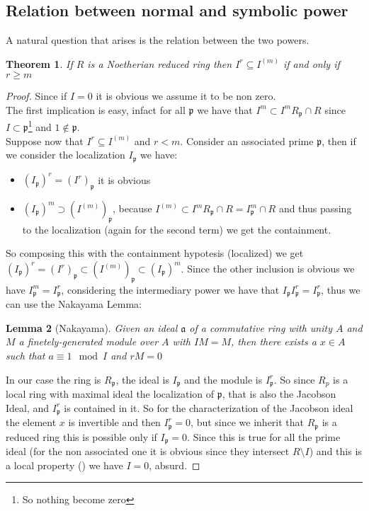 \documentclass[]{article}
\theoremstyle{plain}
\newtheorem{teo}{Theorem}[section]
\newtheorem{lem}[teo]{Lemma}
\theoremstyle{remark}
\theoremstyle{definition}
\newcommand{\p}{\mathfrak{p}}
\newcommand{\A}{\mathfrak{a}}
\begin{document}



\subsection{Relation between normal and symbolic power}
A natural question that arises is the relation between the two powers.


\begin{teo}
	If $ R $ is a Noetherian reduced ring then $ I^r \subseteq I^{(m)}$  if and only if $ r \geq m $
\end{teo}
\begin{proof}
	Since if $ I=0 $ it is obvious we assume it to be non zero.\\
	The first implication is easy, infact for all $ \p $ we have that $ I^m \subset I^mR_\p \cap R $ since $ I \subset \p $\footnote{So nothing become zero} and $ 1 \not \in \p $.\\
	Suppose now that $ I^r \subseteq I^{(m)}$ and $ r < m $. Consider an associated prime $ \p $, then if we consider the localization $ I_\p $ we have:
	\begin{itemize}
	\item $ (I_\p)^r = (I^r)_\p $ it is obvious
	\item $ (I_\p)^m \supset (I^{(m)})_\p $, because $ I^{(m)} \subset I^mR_\p \cap R = I^m_\p \cap R $ and thus passing to the localization (again for the second term) we get the containment.
	\end{itemize}
	So composing this with the containment hypotesis (localized) we get $ (I_\p)^r = (I^r)_\p \subset (I^{(m)})_\p \subset (I_\p)^m $. Since the other inclusion is obvious we have $ I_\p^m= I_\p^r $, considering the intermediary power we have that $ I_\p I_\p^r =I_\p^r $, thus we can use the Nakayama Lemma:
	
	\begin{lem}[Nakayama]
		Given an ideal $ \A $ of a commutative ring with unity $ A $ and $ M $ a finetely-generated module over $ A $ with $ IM = M $, then there exists a $ x \in A $ such that $ a \equiv 1 \mod I $ and $ rM = 0 $
	\end{lem}
	In our case the ring is $ R_\p $, the ideal is $ I_\p $ and the module is $ I_\p^{r} $. So since $ R_p $ is a local ring with maximal ideal the localization of $ \p $, that is also the Jacobson Ideal, and $ I_\p ^r $ is contained in it. So for the characterization of the Jacobson ideal the element $ x $ is invertible and then $ I_\p^r = 0 $, but since we inherit that $ R_\p $ is a reduced ring this is possible only if $ I_\p = 0$. Since this is true for all the prime ideal (for the non associated one it is obvious since they intersect $ R \setminus I $) and this is a local property (\cite[Proposition 3.8]{AMCD}) we have $ I = 0 $, absurd.
\end{proof} 
\end{document}
